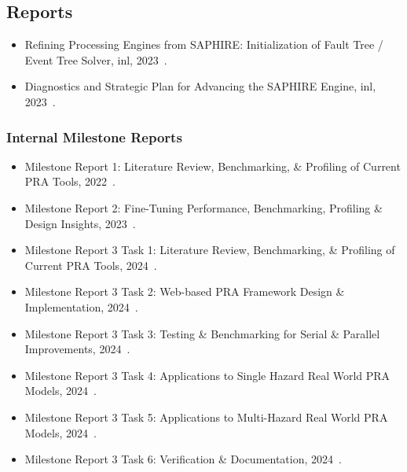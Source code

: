 \subsection{Reports}
\begin{itemize}
    \item {Refining Processing Engines from SAPHIRE: Initialization of Fault Tree / Event Tree Solver, \acrshort{inl}, 2023~\cite{aras_refining_2023}.}
    \item {Diagnostics and Strategic Plan for Advancing the SAPHIRE Engine, \acrshort{inl}, 2023~\cite{aras_diagnostics_2023}.}
\end{itemize}
\subsubsection*{Internal Milestone Reports}
\begin{itemize}
    \item {Milestone Report 1: Literature Review, Benchmarking, \& Profiling of Current PRA Tools}, 2022~\cite{aras_milestone_2022}.
    \item {Milestone Report 2: Fine-Tuning Performance, Benchmarking, Profiling \& Design Insights}, 2023~\cite{aras_milestone_2023}.
    \item {Milestone Report 3 Task 1: Literature Review, Benchmarking, \& Profiling of Current PRA Tools}, 2024~\cite{aras_milestone_2024-1}.
    \item {Milestone Report 3 Task 2: Web-based PRA Framework Design \& Implementation}, 2024~\cite{aras_milestone_2024-2}.
    \item {Milestone Report 3 Task 3: Testing \& Benchmarking for Serial \& Parallel Improvements}, 2024~\cite{aras_milestone_2024-3}.
    \item {Milestone Report 3 Task 4: Applications to Single Hazard Real World PRA Models}, 2024~\cite{aras_milestone_2024-4}.
    \item {Milestone Report 3 Task 5: Applications to Multi-Hazard Real World PRA Models}, 2024~\cite{aras_milestone_2024-5}.
    \item {Milestone Report 3 Task 6: Verification \& Documentation}, 2024~\cite{rasheeq_milestone_2024-6}.
\end{itemize}